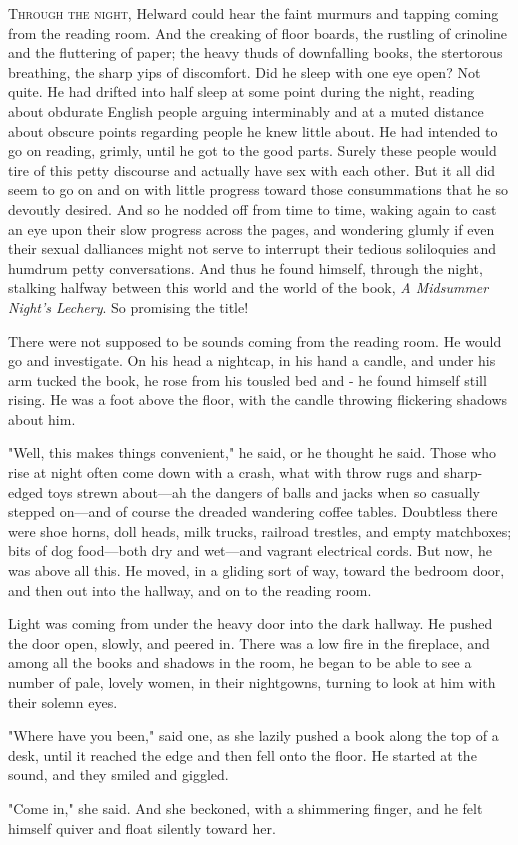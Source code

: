 
\lettrine{T}{hrough the night,} Helward could hear the faint murmurs and tapping
coming from the reading room. And the creaking of floor boards, the
rustling of crinoline and the fluttering of paper; the heavy thuds of
downfalling books, the stertorous breathing, the sharp yips of
discomfort. Did he sleep with one eye open? Not quite. He had drifted
into half sleep at some point during the night, reading about obdurate
English people arguing interminably and at a muted distance about
obscure points regarding people he knew little about. He had intended to
go on reading, grimly, until he got to the good parts. Surely these
people would tire of this petty discourse and actually have sex with
each other. But it all did seem to go on and on with little progress
toward those consummations that he so devoutly desired. And so he nodded
off from time to time, waking again to cast an eye upon their slow
progress across the pages, and wondering glumly if even their sexual
dalliances might not serve to interrupt their tedious soliloquies and
humdrum petty conversations. And thus he found himself, through the
night, stalking halfway between this world and the world of the book,
\emph{A Midsummer Night's Lechery}. So promising the title!

There were not supposed to be sounds coming from the reading room. He
would go and investigate. On his head a nightcap, in his hand a candle,
and under his arm tucked the book, he rose from his tousled bed and - he
found himself still rising. He was a foot above the floor, with the
candle throwing flickering shadows about him.

"Well, this makes things convenient," he said, or he thought he said.
Those who rise at night often come down with a crash, what with throw
rugs and sharp-edged toys strewn about---ah the dangers of balls and
jacks when so casually stepped on---and of course the dreaded wandering
coffee tables. Doubtless there were shoe horns, doll heads, milk trucks,
railroad trestles, and empty matchboxes; bits of dog food---both dry and
wet---and vagrant electrical cords. But now, he was above all this. He
moved, in a gliding sort of way, toward the bedroom door, and then out
into the hallway, and on to the reading room.

Light was coming from under the heavy door into the dark hallway. He
pushed the door open, slowly, and peered in. There was a low fire in the
fireplace, and among all the books and shadows in the room, he began to
be able to see a number of pale, lovely women, in their nightgowns,
turning to look at him with their solemn eyes.

"Where have you been," said one, as she lazily pushed a book along the
top of a desk, until it reached the edge and then fell onto the floor.
He started at the sound, and they smiled and giggled.

"Come in," she said. And she beckoned, with a shimmering finger, and he
felt himself quiver and float silently toward her.

